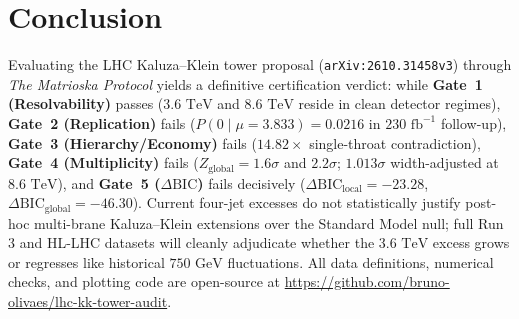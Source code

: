 \documentclass[11pt,a4paper]{article}
\begin{document}
\section{Conclusion}
Evaluating the LHC Kaluza--Klein tower proposal (\texttt{arXiv:2610.31458v3}) through \emph{The Matrioska Protocol} yields a definitive certification verdict: while \textbf{Gate~1 (Resolvability)} passes ($3.6\text{ TeV}$ and $8.6\text{ TeV}$ reside in clean detector regimes), \textbf{Gate~2 (Replication)} fails ($P(0 \mid \mu=3.833) = 0.0216$ in $230\text{ fb}^{-1}$ follow-up), \textbf{Gate~3 (Hierarchy/Economy)} fails ($14.82\times$ single-throat contradiction), \textbf{Gate~4 (Multiplicity)} fails ($Z_{\mathrm{global}} = 1.6\sigma$ and $2.2\sigma$; $1.013\sigma$ width-adjusted at $8.6\text{ TeV}$), and \textbf{Gate~5 ($\Delta\mathrm{BIC}$)} fails decisively ($\Delta\mathrm{BIC}_{\mathrm{local}} = -23.28$, $\Delta\mathrm{BIC}_{\mathrm{global}} = -46.30$). Current four-jet excesses do not statistically justify post-hoc multi-brane Kaluza--Klein extensions over the Standard Model null; full Run 3 and HL-LHC datasets will cleanly adjudicate whether the $3.6\text{ TeV}$ excess grows or regresses like historical $750\text{ GeV}$ fluctuations. All data definitions, numerical checks, and plotting code are open-source at \url{https://github.com/bruno-olivaes/lhc-kk-tower-audit}.



\end{document}
